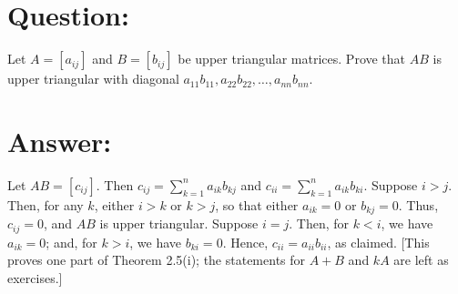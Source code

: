 \documentclass{article}
\begin{document}
\section{Question:}

Let $A=\left[a_{i j}\right]$ and $B=\left[b_{i j}\right]$ be upper triangular matrices. Prove that $A B$ is upper triangular with diagonal $a_{11} b_{11}, a_{22} b_{22}, \ldots, a_{n n} b_{n n}$.

\section{Answer:}

Let $A B=\left[c_{i j}\right]$. Then $c_{i j}=\sum_{k=1}^{n} a_{i k} b_{k j}$ and $c_{i i}=\sum_{k=1}^{n} a_{i k} b_{k i}$. Suppose $i>j$. Then, for any $k$, either $i>k$ or $k>j$, so that either $a_{i k}=0$ or $b_{k j}=0$. Thus, $c_{i j}=0$, and $A B$ is upper triangular. Suppose $i=j$. Then, for $k<i$, we have $a_{i k}=0$; and, for $k>i$, we have $b_{k i}=0$. Hence, $c_{i i}=a_{i i} b_{i i}$, as claimed. [This proves one part of Theorem 2.5(i); the statements for $A+B$ and $k A$ are left as exercises.]
\end{document}
